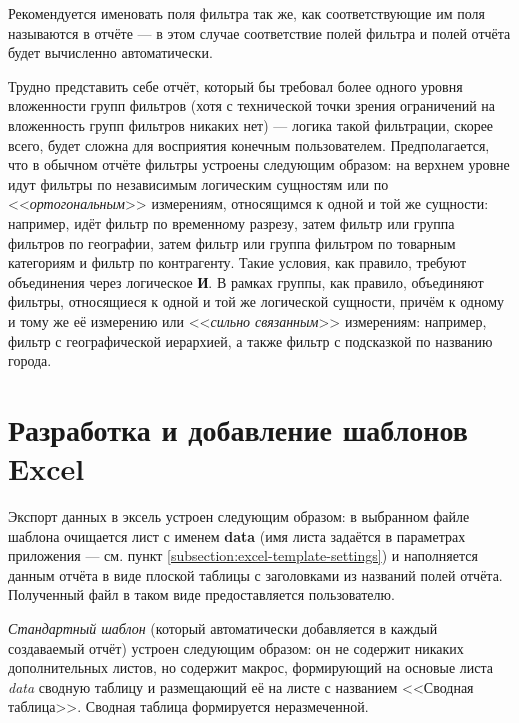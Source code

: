 \documentclass[../user-manual.tex]{subfiles}
\begin{document}
	\begin{devnote}
		Рекомендуется именовать поля фильтра так же, как соответствующие им поля называются в отчёте --- в этом случае соответствие полей фильтра и полей отчёта будет вычисленно автоматически.
	\end{devnote}

	\begin{concept}
		Трудно представить себе отчёт, который бы требовал более одного уровня вложенности групп фильтров (хотя с технической точки зрения ограничений на вложенность групп фильтров никаких нет) --- логика такой фильтрации, скорее всего, будет сложна для восприятия конечным пользователем. Предполагается, что в обычном отчёте фильтры устроены следующим образом: на верхнем уровне идут фильтры по независимым логическим сущностям или по <<\textit{ортогональным}>> измерениям, относящимся к одной и той же сущности: например, идёт фильтр по временн\textit{о}му разрезу, затем фильтр или группа фильтров по географии, затем фильтр или группа фильтром по товарным категориям и фильтр по контрагенту. Такие условия, как правило, требуют объединения через логическое \textbf{И}. В рамках группы, как правило, объединяют фильтры, относящиеся к одной и той же логической сущности, причём к одному и тому же её измерению или <<\textit{сильно связанным}>> измерениям: например, фильтр с географической иерархией, а также фильтр с подсказкой по названию города.
	\end{concept}
	
	\section{Разработка и добавление шаблонов Excel}\label{developing:customized-excel-templates}
	
	Экспорт данных в эксель устроен следующим образом: в выбранном файле шаблона очищается лист с именем \textbf{data} (имя листа задаётся в параметрах приложения --- см. пункт \ref{subsection:excel-template-settings}) и наполняется данным отчёта в виде плоской таблицы с заголовками из названий полей отчёта. Полученный файл в таком виде предоставляется пользователю.
	
	\textit{Стандартный шаблон} (который автоматически добавляется в каждый создаваемый отчёт) устроен следующим образом: он не содержит никаких дополнительных листов, но содержит макрос, формирующий на основые листа \textit{data} сводную таблицу и размещающий её на листе с названием <<Сводная таблица>>. Сводная таблица формируется неразмеченной.
	
\end{document}
